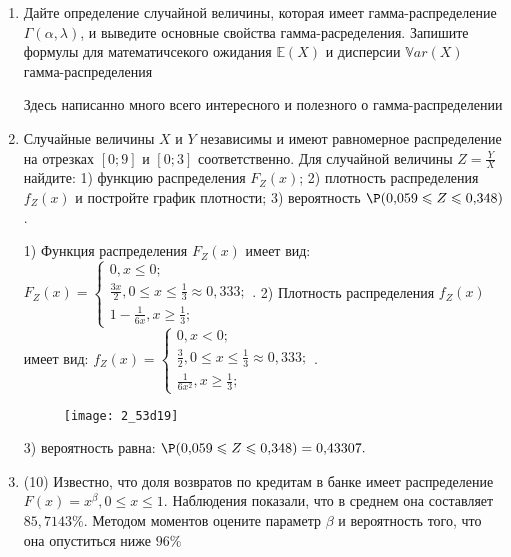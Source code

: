 \documentclass[a4paper,12pt]{article}
\begin{document}
\begin{enumerate}


\item

Дайте определение случайной величины, которая имеет гамма-распределение $\Gamma(\alpha,  \lambda)$, и выведите основные свойства гамма-расределения. Запишите формулы для математичсекого ожидания
$\mathbb{E}(X)$ и дисперсии $\mathbb{V}ar(X)$ гамма-распределения




Здесь написанно много всего интересного и полезного о гамма-распределении


\item



Случайные величины $X$ и $Y$ независимы и имеют равномерное
распределение на отрезках $[0;9]$ и $[0;3]$ соответственно. Для случайной величины $Z=\frac{Y}{X}$ найдите: 
1) функцию распределения $F_Z(x)$;
2) плотность распределения $f_Z(x)$ и постройте график плотности;
3) вероятность $\P(0,\!059\leqslant Z\leqslant 0,\!348)$.




1) Функция распределения $F_Z(x)$ имеет вид:
$
F_Z(x)=\left\{
\begin{array}{l}
0, x\leqslant 0;\\
\frac{3 x}{2}, 0\leqslant x\leqslant \frac{1}{3}\approx 0,\!333;\\
1 - \frac{1}{6 x}, x\geqslant\frac{1}{3};
\end{array}.
\right.
$
2) Плотность распределения $f_Z(x)$ имеет вид:
$
f_Z(x)=\left\{
\begin{array}{l}
0, x<0;\\
\frac{3}{2}, 0\leqslant x\leqslant \frac{1}{3}\approx 0,\!333;\\
\frac{1}{6 x^{2}}, x\geqslant\frac{1}{3};
\end{array}.
\right.
$


\begin{figure}[H]
    \texttt{[image: 2\_53d19]}
\end{figure}


3) вероятность равна:
$
\P(0,\!059\leqslant Z\leqslant 0,\!348)=
0,\!43307.
$


\item


(10) Известно, что доля возвратов по кредитам в банке имеет распределение $F(x) = x ^{\beta}, 0 \leqslant x \leqslant 1$.
Наблюдения показали, что в среднем она составляет $85,7143\%$. Методом моментов оцените параметр $\beta$ и
вероятность того, что она опуститься ниже $96\%$





\end{enumerate}
\end{document}
